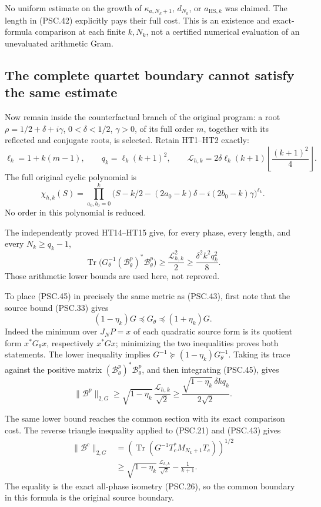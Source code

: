 No uniform estimate on the growth of \(\kappa_{a,N_k+1}\), \(d_{N_k}\), or \(a_{\mathrm{HS},k}\) was claimed. The length in (PSC.42) explicitly pays their full cost. This is an existence and exact-formula comparison at each finite \(k,N_k\), not a certified numerical evaluation of an unevaluated arithmetic Gram.

\subsection{The complete quartet boundary cannot satisfy the same estimate}

Now remain inside the counterfactual branch of the original program: a root
\(\rho=1/2+\delta+i\gamma\), \(0<\delta<1/2\), \(\gamma>0\), of its full order \(m\), together with its reflected and conjugate roots, is selected. Retain HT1–HT2 exactly:
\[
 \ell_k=1+k(m-1),\qquad q_k=\ell_k(k+1)^2,\qquad
 \mathcal L_{h,k}
 =2\delta\ell_k(k+1)
        \left\lfloor\frac{(k+1)^2}{4}\right\rfloor.
 \tag{PSC.44}
\]
The full original cyclic polynomial is
\[
 \chi_{h,k}(S)
 =\prod_{a_0,b_0=0}^k
 \bigl(S-k/2-(2a_0-k)\delta-i(2b_0-k)\gamma\bigr)^{\ell_k}.
 \]
No order in this polynomial is reduced.

The independently proved HT14–HT15 give, for every phase, every length, and every \(N_k\geq q_k-1\),
\[
 \operatorname{Tr}\bigl(
     G_\theta^{-1}(\mathscr B^p_\theta)^*\mathscr B^p_\theta\bigr)
 \geq\frac{\mathcal L_{h,k}^2}{2}
 \geq\frac{\delta^2 k^2q_k^2}{8}.
 \tag{PSC.45}
\]
Those arithmetic lower bounds are used here, not reproved.

To place (PSC.45) in precisely the same metric as (PSC.43), first note that the source bound (PSC.33) gives
\[
 (1-\eta_k)G\preceq G_\theta\preceq(1+\eta_k)G.
 \tag{PSC.46}
\]
Indeed the minimum over \(J_NP=x\) of each quadratic source form is its quotient form \(x^*G_\theta x\), respectively \(x^*Gx\); minimizing the two inequalities proves both statements. The lower inequality implies
\(G^{-1}\succeq(1-\eta_k)G_\theta^{-1}\).
Taking its trace against the positive matrix
\((\mathscr B^p_\theta)^*\mathscr B^p_\theta\), and then integrating (PSC.45), gives
\[
 \|\mathscr B^p\|_{2,G}
 \geq\sqrt{1-\eta_k}\,
       \frac{\mathcal L_{h,k}}{\sqrt2}
 \geq\frac{\sqrt{1-\eta_k}\,\delta kq_k}{2\sqrt2}.
 \tag{PSC.47}
\]

The same lower bound reaches the common section with its exact comparison cost. The reverse triangle inequality applied to (PSC.21) and (PSC.43) gives
\[
 \boxed{
 \begin{aligned}
 \|\mathscr B^c\|_{2,G}
 &=\left(\operatorname{Tr}
      (G^{-1}T_c^*M_{N_k+1}T_c)\right)^{1/2}\\
 &\geq\sqrt{1-\eta_k}\,
       \frac{\mathcal L_{h,k}}{\sqrt2}-\frac1{k+1}.
 \end{aligned}}
 \tag{PSC.48}
\]
The equality is the exact all-phase isometry (PSC.26), so the common boundary in this formula is the original source boundary.

